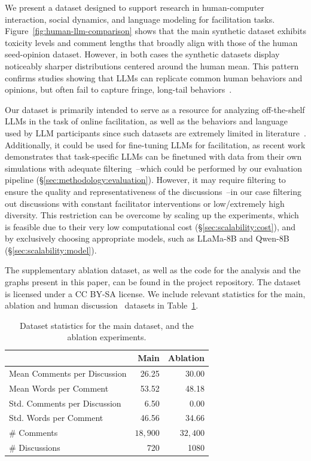 We present a dataset designed to support research in human-computer interaction, social dynamics, and language modeling for facilitation tasks. Figure~\ref{fig:human-llm-comparison} shows that the main synthetic dataset exhibits toxicity levels and comment lengths that broadly align with those of the human seed-opinion dataset. However, in both cases the synthetic datasets display noticeably sharper distributions centered around the human mean. This pattern confirms studies showing that LLMs can replicate common human behaviors and opinions, but often fail to capture fringe, long-tail behaviors~\cite{wu2025llm, madden2025evaluating,ivetta2025synthetic, kaiser2025simulating}.

Our dataset is primarily intended to serve as a resource for analyzing off-the-shelf LLMs in the task of online facilitation, as well as the behaviors and language used by LLM participants since such datasets are extremely limited in literature~\cite{korre2025evaluation}. Additionally, it could be used for fine-tuning LLMs for facilitation, as recent work demonstrates that task-specific LLMs can be finetuned with data from their own simulations with adequate filtering~\cite{ulmer2024}--which could be performed by our evaluation pipeline (\S\ref{sec:methodology:evaluation}). However, it may require filtering to ensure the quality and representativeness of the discussions~\cite{ulmer2024}--in our case filtering out discussions with constant facilitator interventions or low/extremely high diversity. This restriction can be overcome by scaling up the experiments, which is feasible due to their very low computational cost (\S\ref{sec:scalability:cost}), and by exclusively choosing appropriate models, such as LLaMa-8B and Qwen-8B (\S\ref{sec:scalability:model}).


The supplementary ablation dataset, as well as the code for the analysis and the graphs present in this paper, can be found in the project repository. The dataset is licensed under a CC BY-SA license. We include relevant statistics for the main, ablation and human discussion~\cite{chang-danescu-niculescu-mizil-2019-trouble} datasets in Table~\ref{tab:dataset-stats}.

\begin{table}[ht]
	\caption{Dataset statistics for the main dataset, and the ablation experiments.}
	\label{tab:dataset-stats}
	\begin{tabular}{lrr}
		\toprule
		& Main & Ablation  \\
		\midrule
		Mean Comments per Discussion & 26.25 & 30.00\\
		Mean Words per Comment & 53.52 & 48.18 \\
		Std. Comments per Discussion & 6.50 & 0.00  \\
		Std. Words per Comment & 46.56 & 34.66  \\
		\# Comments & $18{,}900$ & $32{,}400$  \\
		\# Discussions & 720 & 1080 \\
		\bottomrule
	\end{tabular}
\end{table}
